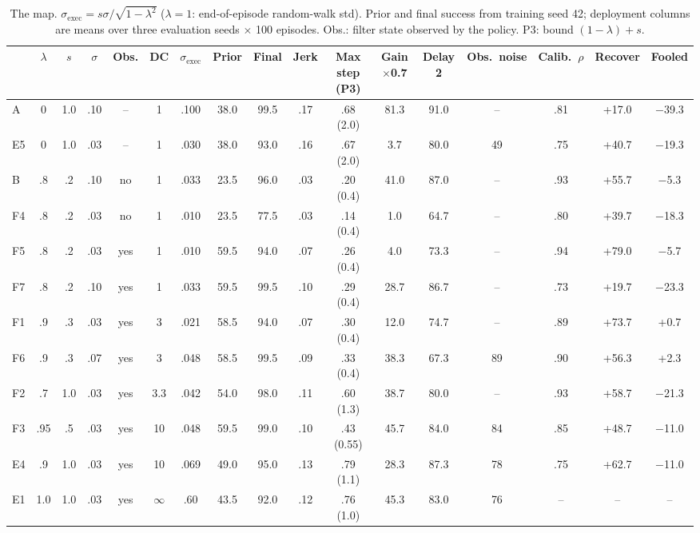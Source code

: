 \documentclass[conference]{IEEEtran}
\newcommand{\sexec}{\sigma_{\mathrm{exec}}}
\begin{document}
\begin{table}[t]
\centering
\caption{The map. $\sexec=s\sigma/\sqrt{1-\lambda^2}$ ($\lambda=1$: end-of-episode random-walk std). Prior and final success from training seed 42; deployment columns are means over three evaluation seeds $\times$ 100 episodes. Obs.: filter state observed by the policy. P3: bound $(1-\lambda)+s$.}
\label{tab:points}
\small
\begin{tabular}{l ccc c c c | cc | cc | ccc | ccc}
\toprule
& $\lambda$ & $s$ & $\sigma$ & Obs. & DC & $\sexec$ & Prior & Final & Jerk & Max step (P3) & Gain$\times$0.7 & Delay 2 & Obs.\ noise & Calib.\ $\rho$ & Recover & Fooled \\
\midrule
A  & 0    & 1.0 & .10 & --  & 1        & .100 & 38.0 & 99.5 & .17 & .68 (2.0) & 81.3 & 91.0 & -- & .81 & +17.0 & $-$39.3 \\
E5 & 0    & 1.0 & .03 & --  & 1        & .030 & 38.0 & 93.0 & .16 & .67 (2.0) & 3.7  & 80.0 & 49 & .75 & +40.7 & $-$19.3 \\
B  & .8   & .2  & .10 & no  & 1        & .033 & 23.5 & 96.0 & .03 & .20 (0.4) & 41.0 & 87.0 & -- & .93 & +55.7 & $-$5.3 \\
F4 & .8   & .2  & .03 & no  & 1        & .010 & 23.5 & 77.5 & .03 & .14 (0.4) & 1.0  & 64.7 & -- & .80 & +39.7 & $-$18.3 \\
F5 & .8   & .2  & .03 & yes & 1        & .010 & 59.5 & 94.0 & .07 & .26 (0.4) & 4.0  & 73.3 & -- & .94 & +79.0 & $-$5.7 \\
F7 & .8   & .2  & .10 & yes & 1        & .033 & 59.5 & 99.5 & .10 & .29 (0.4) & 28.7 & 86.7 & -- & .73 & +19.7 & $-$23.3 \\
F1 & .9   & .3  & .03 & yes & 3        & .021 & 58.5 & 94.0 & .07 & .30 (0.4) & 12.0 & 74.7 & -- & .89 & +73.7 & +0.7 \\
F6 & .9   & .3  & .07 & yes & 3        & .048 & 58.5 & 99.5 & .09 & .33 (0.4) & 38.3 & 67.3 & 89 & .90 & +56.3 & +2.3 \\
F2 & .7   & 1.0 & .03 & yes & 3.3      & .042 & 54.0 & 98.0 & .11 & .60 (1.3) & 38.7 & 80.0 & -- & .93 & +58.7 & $-$21.3 \\
F3 & .95  & .5  & .03 & yes & 10       & .048 & 59.5 & 99.0 & .10 & .43 (0.55) & 45.7 & 84.0 & 84 & .85 & +48.7 & $-$11.0 \\
E4 & .9   & 1.0 & .03 & yes & 10       & .069 & 49.0 & 95.0 & .13 & .79 (1.1) & 28.3 & 87.3 & 78 & .75 & +62.7 & $-$11.0 \\
E1 & 1.0  & 1.0 & .03 & yes & $\infty$ & .60  & 43.5 & 92.0 & .12 & .76 (1.0) & 45.3 & 83.0 & 76 & -- & -- & -- \\
\bottomrule
\end{tabular}
\end{table}
\end{document}
